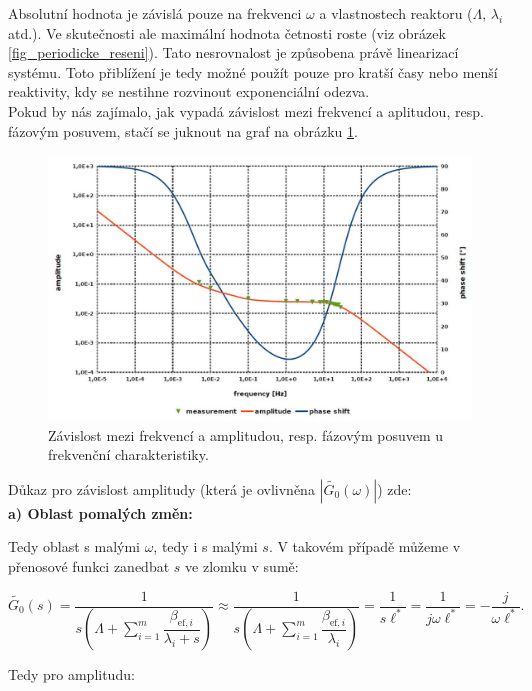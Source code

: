 Absolutní hodnota je závislá pouze na frekvenci $\omega$ a vlastnostech reaktoru ($\Lambda$, $\lambda_i$ atd.). Ve skutečnosti ale maximální hodnota četnosti roste (viz obrázek \ref{fig_periodicke_reseni}). Tato nesrovnalost je způsobena právě linearizací systému. Toto přiblížení je tedy možné použít pouze pro kratší časy nebo menší reaktivity, kdy se nestihne rozvinout exponenciální odezva.\\

Pokud by nás zajímalo, jak vypadá závislost mezi frekvencí a aplitudou, resp. fázovým posuvem, stačí se juknout na graf na obrázku \ref{fig_frekvencni_zavislost}.

\begin{figure}[H]
  \centering
  \includegraphics[width=1\textwidth]{img/frekvencni_zavislost.jpg}
  \caption{Závislost mezi frekvencí a amplitudou, resp. fázovým posuvem u frekvenční charakteristiky.}
  \label{fig_frekvencni_zavislost}
\end{figure}

Důkaz pro závislost amplitudy (která je ovlivněna $|\tilde{G_0}(\omega)|$) zde:\\

\textbf{a) Oblast pomalých změn:}

Tedy oblast s malými $\omega$, tedy i s malými $s$. V takovém případě můžeme v přenosové funkci zanedbat $s$ ve zlomku v sumě:

$$ \tilde{G_0}(s) = \dfrac{1}{s \left ( \Lambda + \sum_{i=1}^m \dfrac{\beta_{\text{ef},i}}{\lambda_i + s} \right )} \approx \dfrac{1}{s \left ( \Lambda + \sum_{i=1}^m \dfrac{\beta_{\text{ef},i}}{\lambda_i} \right )} = \dfrac{1}{s \ell^*} = \dfrac{1}{j \omega \ell^*} = - \dfrac{j}{\omega \ell^*}. $$

Tedy pro amplitudu:


